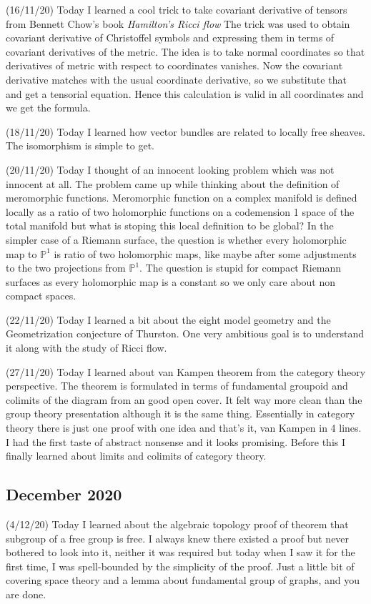\documentclass[12pt,a4paper]{article}
\begin{document}
(16/11/20) Today I learned a cool trick to take covariant derivative of tensors from Bennett Chow's book \textit{Hamilton's Ricci flow} The trick was used to obtain covariant derivative of Christoffel symbols and expressing them in terms of covariant derivatives of the metric. The idea is to take normal coordinates so that derivatives of metric with respect to coordinates vanishes. Now the covariant derivative matches with the usual coordinate derivative, so we substitute that and get a tensorial equation. Hence this calculation is valid in all coordinates and we get the formula.

(18/11/20) Today I learned how vector bundles are related to locally free sheaves. The isomorphism is simple to get.

(20/11/20) Today I thought of an innocent looking problem which was not innocent at all.  The problem came up while thinking about the definition of meromorphic functions. Meromorphic function on a complex manifold is defined locally as a ratio of two holomorphic functions on a codemension 1 space of the total manifold but what is stoping this local definition to be global? In the simpler case of a Riemann surface, the question is whether every holomorphic map to $\mathbb{P}^1$ is ratio of two holomorphic maps, like maybe after some adjustments to the two projections from $\mathbb{P}^1$. The question is stupid for compact Riemann surfaces as every holomorphic map is a constant so we only care about non compact spaces.

(22/11/20) Today I learned a bit about the eight model geometry and the Geometrization conjecture of Thurston. One very ambitious goal is to understand it along with the study of Ricci flow.

(27/11/20) Today I learned about van Kampen theorem from the category theory perspective. The theorem is formulated in terms of fundamental groupoid and colimits of the diagram from an good open cover. It felt way more clean than the group theory presentation although it is the same thing. Essentially in category theory there is just one proof with one idea and that's it, van Kampen in 4 lines. I had the first taste of abstract nonsense and it looks promising. Before this I finally learned about limits and colimits of category theory. 

\subsection*{December 2020}

\quad (4/12/20) Today I learned about the algebraic topology proof of theorem that subgroup of a free group is free. I always knew there existed a proof but never bothered to look into it, neither it was required but today when I saw it for the first time, I was spell-bounded by the simplicity of the proof. Just a little bit of covering space theory and a lemma about fundamental group of graphs, and you are done.
\end{document}

